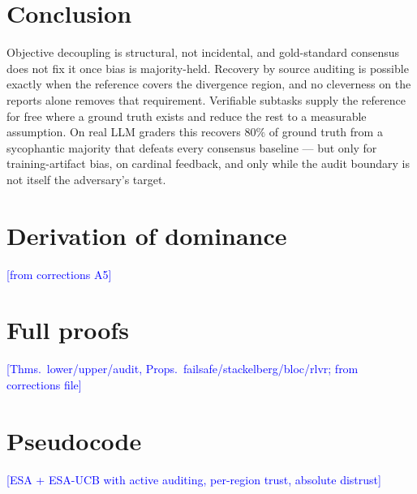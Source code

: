 \documentclass[11pt]{article}
\theoremstyle{definition}\newtheorem{definition}{Definition}
\theoremstyle{definition}\newtheorem{assumption}{Assumption}
\newcommand{\note}[1]{\textcolor{blue}{[#1]}}
\begin{document}
\section{Conclusion}
Objective decoupling is structural, not incidental, and gold-standard consensus does not fix it once
bias is majority-held. Recovery by source auditing is possible exactly when the reference covers the
divergence region, and no cleverness on the reports alone removes that requirement. Verifiable
subtasks supply the reference for free where a ground truth exists and reduce the rest to a
measurable assumption. On real LLM graders this recovers $80\%$ of ground truth from a sycophantic
majority that defeats every consensus baseline --- but only for training-artifact bias, on cardinal
feedback, and only while the audit boundary is not itself the adversary's target.



\appendix
\section{Derivation of dominance}\label{app:dominance}\note{from corrections A5}
\section{Full proofs}\label{app:proofs}\note{Thms.~lower/upper/audit, Props.~failsafe/stackelberg/bloc/rlvr; from corrections file}
\section{Pseudocode}\label{app:algo}\note{ESA + ESA-UCB with active auditing, per-region trust, absolute distrust}
\end{document}
